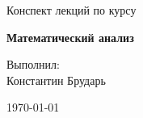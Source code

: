 \begin{titlepage}
    \centering

    \vspace*{\fill}

    {\LARGE Конспект лекций по курсу}

    {\Huge\bfseries Математический анализ}

    \vfill

    \hfill \begin{minipage}{0.5\textwidth}
        \begin{flushleft}
            Выполнил: \\
            Константин Брударь
        \end{flushleft}
    \end{minipage}

    \vfill

    {\large \today}
\end{titlepage}
